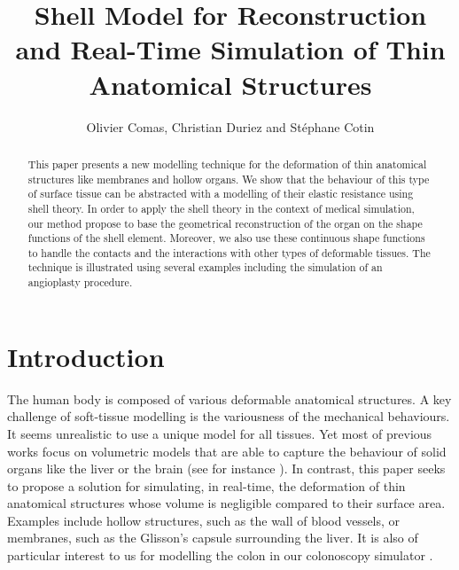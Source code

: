 \documentclass{llncs}
\begin{document}
\title{Shell Model for Reconstruction and Real-Time Simulation of Thin Anatomical Structures}
\author{Olivier Comas, Christian Duriez and St\'ephane Cotin}
\institute{INRIA, Shaman team, Lille, France
\and Preventative Health Flagship, CSIRO ICT, AEHRC, Brisbane, Australia}

\maketitle

\begin{abstract}
This paper presents a new modelling technique for the deformation of thin anatomical structures like membranes and hollow organs. We show that the behaviour of this type of surface tissue can be abstracted with a modelling of their elastic resistance using shell theory. In order to apply the shell theory in the context of medical simulation, our method propose to base the geometrical reconstruction of the organ on the shape functions of the shell element. Moreover, we also use these continuous shape functions to handle the contacts and the interactions with other types of deformable tissues. The technique is illustrated using several examples including the simulation of an angioplasty procedure.
\end{abstract}

\section{Introduction}

The human body is composed of various deformable anatomical structures. 
A key challenge of soft-tissue modelling is the variousness of the mechanical behaviours. It seems unrealistic to use a unique model for all tissues.
Yet most of previous works focus on volumetric models that are able to capture the behaviour of solid organs like the liver or the brain (see for instance \cite{Miller07,Delingette08}). In contrast, this paper seeks to propose a solution for simulating, in real-time, the deformation of thin anatomical structures whose volume is negligible compared to their surface area. Examples include hollow structures, such as the wall of blood vessels, or membranes, such as the Glisson's capsule surrounding the liver. It is also of particular interest to us for modelling the colon in our colonoscopy simulator \cite{deVisser10}.
\end{document}
